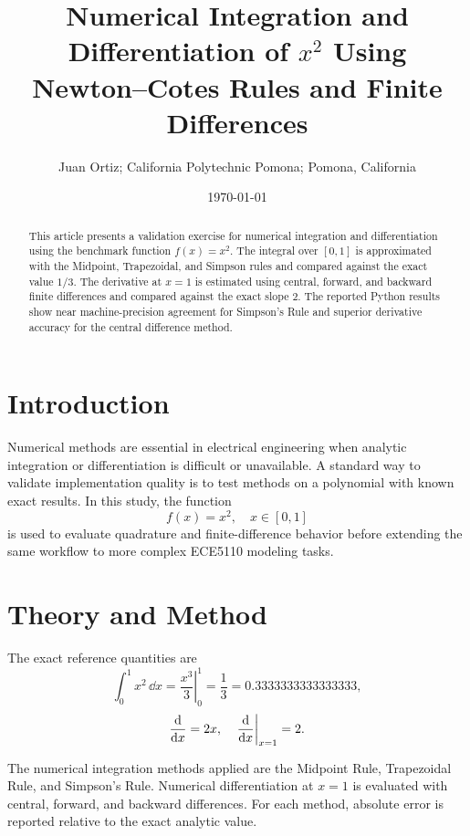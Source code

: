 \documentclass[letterpaper,twocolumn,fleqn]{article}
\title{Numerical Integration and Differentiation of $x^2$ Using Newton--Cotes Rules and Finite Differences}
\author{Juan Ortiz; California Polytechnic Pomona; Pomona, California}
\date{\today}
\begin{document}
\maketitle
\thispagestyle{empty}

\begin{abstract}
This article presents a validation exercise for numerical integration and differentiation using the benchmark function $f(x)=x^2$. The integral over $[0,1]$ is approximated with the Midpoint, Trapezoidal, and Simpson rules and compared against the exact value $1/3$. The derivative at $x=1$ is estimated using central, forward, and backward finite differences and compared against the exact slope $2$. The reported Python results show near machine-precision agreement for Simpson's Rule and superior derivative accuracy for the central difference method.
\end{abstract}

\section{Introduction}
\label{sec:intro}
Numerical methods are essential in electrical engineering when analytic integration or differentiation is difficult or unavailable. A standard way to validate implementation quality is to test methods on a polynomial with known exact results. In this study, the function
\[
f(x)=x^2, \quad x\in[0,1]
\]
is used to evaluate quadrature and finite-difference behavior before extending the same workflow to more complex ECE5110 modeling tasks.

\section{Theory and Method}
The exact reference quantities are
\[
\int_0^1 x^2\,\dd x = \left.\frac{x^3}{3}\right|_{0}^{1}=\frac{1}{3}=0.3333333333333333,
\]
\[
\dv{}{x}(x^2)=2x, \quad \left.\dv{}{x}(x^2)\right|_{x=1}=2.
\]

The numerical integration methods applied are the Midpoint Rule, Trapezoidal Rule, and Simpson's Rule. Numerical differentiation at $x=1$ is evaluated with central, forward, and backward differences. For each method, absolute error is reported relative to the exact analytic value.
\end{document}
